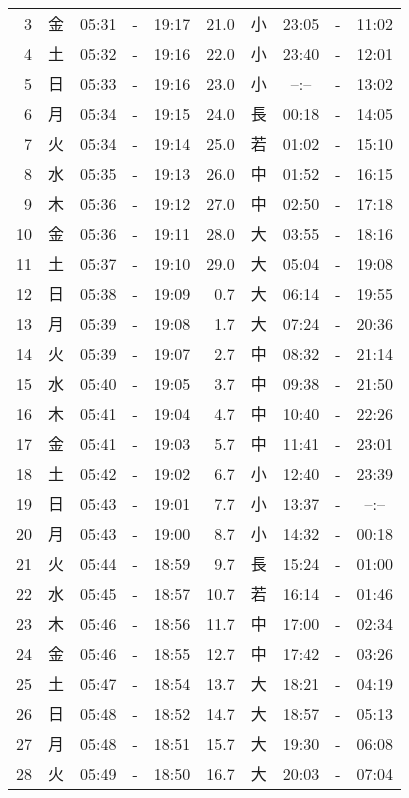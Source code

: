 \documentclass[a4j,10pt]{jsarticle}
\begin{document}
\begin{center}
\begin{table}[ht]
\begin{center}
\begin{tabular}{|rc|ccc|rc|ccc|}
  3 & 金 & 05:31 &-& 19:17 & 21.0 & 小 & 23:05 &-& 11:02 \\
  4 & 土 & 05:32 &-& 19:16 & 22.0 & 小 & 23:40 &-& 12:01 \\
  5 & 日 & 05:33 &-& 19:16 & 23.0 & 小 & --:-- &-& 13:02 \\
  6 & 月 & 05:34 &-& 19:15 & 24.0 & 長 & 00:18 &-& 14:05 \\
  7 & 火 & 05:34 &-& 19:14 & 25.0 & 若 & 01:02 &-& 15:10 \\
  8 & 水 & 05:35 &-& 19:13 & 26.0 & 中 & 01:52 &-& 16:15 \\
  9 & 木 & 05:36 &-& 19:12 & 27.0 & 中 & 02:50 &-& 17:18 \\
 10 & 金 & 05:36 &-& 19:11 & 28.0 & 大 & 03:55 &-& 18:16 \\
 11 & 土 & 05:37 &-& 19:10 & 29.0 & 大 & 05:04 &-& 19:08 \\
 12 & 日 & 05:38 &-& 19:09 &  0.7 & 大 & 06:14 &-& 19:55 \\
 13 & 月 & 05:39 &-& 19:08 &  1.7 & 大 & 07:24 &-& 20:36 \\
 14 & 火 & 05:39 &-& 19:07 &  2.7 & 中 & 08:32 &-& 21:14 \\
 15 & 水 & 05:40 &-& 19:05 &  3.7 & 中 & 09:38 &-& 21:50 \\
 16 & 木 & 05:41 &-& 19:04 &  4.7 & 中 & 10:40 &-& 22:26 \\
 17 & 金 & 05:41 &-& 19:03 &  5.7 & 中 & 11:41 &-& 23:01 \\
 18 & 土 & 05:42 &-& 19:02 &  6.7 & 小 & 12:40 &-& 23:39 \\
 19 & 日 & 05:43 &-& 19:01 &  7.7 & 小 & 13:37 &-& --:-- \\
 20 & 月 & 05:43 &-& 19:00 &  8.7 & 小 & 14:32 &-& 00:18 \\
 21 & 火 & 05:44 &-& 18:59 &  9.7 & 長 & 15:24 &-& 01:00 \\
 22 & 水 & 05:45 &-& 18:57 & 10.7 & 若 & 16:14 &-& 01:46 \\
 23 & 木 & 05:46 &-& 18:56 & 11.7 & 中 & 17:00 &-& 02:34 \\
 24 & 金 & 05:46 &-& 18:55 & 12.7 & 中 & 17:42 &-& 03:26 \\
 25 & 土 & 05:47 &-& 18:54 & 13.7 & 大 & 18:21 &-& 04:19 \\
 26 & 日 & 05:48 &-& 18:52 & 14.7 & 大 & 18:57 &-& 05:13 \\
 27 & 月 & 05:48 &-& 18:51 & 15.7 & 大 & 19:30 &-& 06:08 \\
 28 & 火 & 05:49 &-& 18:50 & 16.7 & 大 & 20:03 &-& 07:04 \\

\end{tabular}
\end{center}
\end{table}
\end{center}
\end{document}
